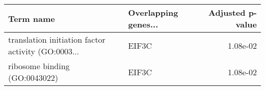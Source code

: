 \begin{tabular}{llr}
\toprule
                                         Term name & Overlapping genes... &  Adjusted p-value \\
\midrule
translation initiation factor activity (GO:0003... &                EIF3C &          1.08e-02 \\
                     ribosome binding (GO:0043022) &                EIF3C &          1.08e-02 \\
\bottomrule
\end{tabular}
